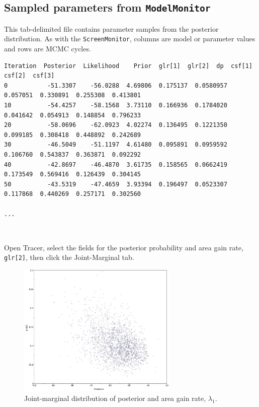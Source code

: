 \documentclass[11pt]{article}
\newcommand{\impmark}{\strut\vadjust{\domark}}
\newcommand{\domark}{%
  \vbox to 0pt{
    \kern-\dp\strutbox
    \smash{\llap{$\rightarrow$\kern1em}}
    \vss
  }%
}
\begin{document}
\subsection{Sampled parameters from {\tt ModelMonitor}}

This tab-delimited file contains parameter samples from the posterior distribution.
As with the {\tt ScreenMonitor}, columns are model or parameter values and rows are MCMC cycles.

\begin{framed}
\begin{lstlisting}[basicstyle=\tiny \listingsfont, columns=texcl]
Iteration  Posterior  Likelihood    Prior  glr[1]  glr[2]  dp  csf[1]  csf[2]  csf[3]
0           -51.3307    -56.0288  4.69806  0.175137  0.0580957  0.057051  0.330891  0.255308  0.413801
10          -54.4257    -58.1568  3.73110  0.166936  0.1784020  0.041642  0.054913  0.148854  0.796233
20          -58.0696    -62.0923  4.02274  0.136495  0.1221350  0.099185  0.308418  0.448892  0.242689
30          -46.5049    -51.1197  4.61480  0.095891  0.0959592  0.106760  0.543837  0.363871  0.092292
40          -42.8697    -46.4870  3.61735  0.158565  0.0662419  0.173549  0.569416  0.126439  0.304145
50          -43.5319    -47.4659  3.93394  0.196497  0.0523307  0.117868  0.440269  0.257171  0.302560

...
\end{lstlisting}
\end{framed}

\noindent \\ \impmark Open Tracer, select the fields for the posterior probability and area gain rate, {\tt glr[2]}, then click the Joint-Marginal tab.

\begin{figure}[H]
\centering
\includegraphics[width=3in]{figures/joint_rgain_posterior}
\caption{Joint-marginal distribution of posterior and area gain rate, $\lambda_1$.}
\end{figure}
\end{document}

